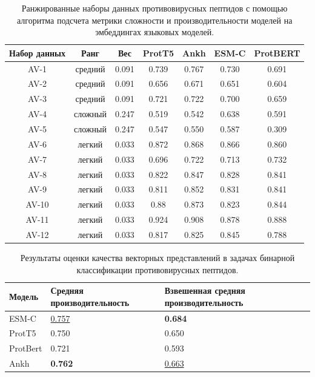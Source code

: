 \documentclass[specification,annotation,times]{itmo-student-thesis}
\begin{document}
\begin{table}[h]
\centering
\caption{Ранжированные наборы данных противовирусных пептидов с помощью алгоритма подсчета метрики сложности и производительности моделей на эмбеддингах языковых моделей.}
\label{tab:model_performance_av}

\begin{tabular}{|c|c|c|c|c|c|c|}
\hline
Набор данных & Ранг & Вес & ProtT5 & Ankh & ESM-C & ProtBERT \\
\hline
AV-1 & средний & 0.091 & 0.739 & 0.767 & 0.730 & 0.691 \\ \hline
AV-2 & средний & 0.091 & 0.656 & 0.671 & 0.651 & 0.604 \\ \hline
AV-3 & средний & 0.091 & 0.721 & 0.722 & 0.700 & 0.659 \\ \hline
AV-4 & сложный & 0.247 & 0.519 & 0.542 & 0.638 & 0.591 \\ \hline
AV-5 & сложный & 0.247 & 0.547 & 0.550 & 0.587 & 0.309 \\ \hline
AV-6 & легкий & 0.033 & 0.872 & 0.868 & 0.866 & 0.860 \\ \hline
AV-7 & легкий & 0.033 & 0.696 & 0.722 & 0.713 & 0.732 \\ \hline
AV-8 & легкий & 0.033 & 0.822 & 0.847 & 0.828 & 0.841 \\ \hline
AV-9 & легкий & 0.033 & 0.811 & 0.852 & 0.831 & 0.841 \\ \hline
AV-10 & легкий & 0.033 & 0.88 & 0.873 & 0.823 & 0.844 \\ \hline
AV-11 & легкий & 0.033 & 0.924 & 0.908 & 0.878 & 0.888 \\ \hline
AV-12 & легкий & 0.033 & 0.817 & 0.825 & 0.845 & 0.788 \\ \hline
\end{tabular}

\end{table}


\begin{table}[h]
\centering

\caption{Результаты оценки качества векторных представлений в задачах бинарной классификации противовирусных пептидов.}
\label{tab:compare_results_av}
\begin{tabular}{|p{3cm}|p{5cm}|p{5cm}|}
\hline
Модель & Средняя \newline производительность & Взвешенная \newline средняя \newline производительность \\
\hline
ESM-C & \underline{0.757} & \textbf{0.684} \\ \hline
ProtT5 & 0.750 & 0.650 \\ \hline
ProtBert & 0.721 & 0.593 \\ \hline
Ankh & \textbf{0.762} & \underline{0.663} \\ \hline
\end{tabular}

\end{table}
\end{document}
